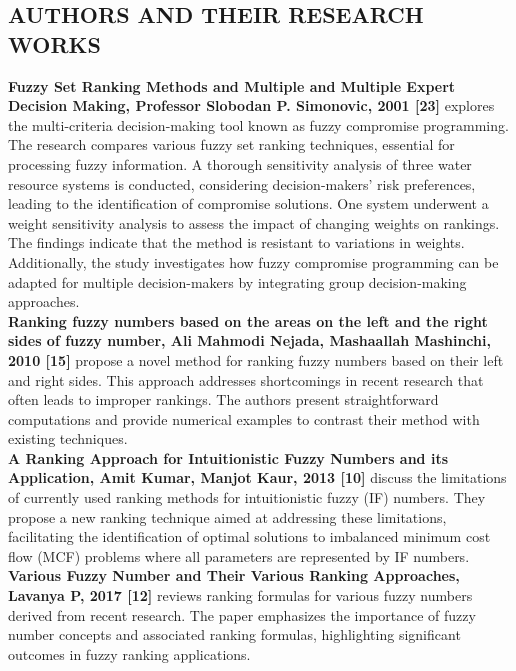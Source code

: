 \documentclass[12pt,a4paper]{article}
\begin{document}
\subsection{AUTHORS AND THEIR RESEARCH WORKS}

\hspace{1em}\textbf{Fuzzy Set Ranking Methods and Multiple and Multiple Expert Decision Making, Professor Slobodan P. Simonovic, 2001 [23]} explores the multi-criteria decision-making tool known as fuzzy compromise programming. The research compares various fuzzy set ranking techniques, essential for processing fuzzy information. A thorough sensitivity analysis of three water resource systems is conducted, considering decision-makers' risk preferences, leading to the identification of compromise solutions. One system underwent a weight sensitivity analysis to assess the impact of changing weights on rankings. The findings indicate that the method is resistant to variations in weights. Additionally, the study investigates how fuzzy compromise programming can be adapted for multiple decision-makers by integrating group decision-making approaches.\\

\textbf{ Ranking fuzzy numbers based on the areas on the left and the right sides of fuzzy number, Ali Mahmodi Nejada, Mashaallah Mashinchi, 2010 [15]} propose a novel method for ranking fuzzy numbers based on their left and right sides. This approach addresses shortcomings in recent research that often leads to improper rankings. The authors present straightforward computations and provide numerical examples to contrast their method with existing techniques.\\

\textbf{A Ranking Approach for Intuitionistic Fuzzy Numbers and its Application, Amit Kumar, Manjot Kaur, 2013 [10] }discuss the limitations of currently used ranking methods for intuitionistic fuzzy (IF) numbers. They propose a new ranking technique aimed at addressing these limitations, facilitating the identification of optimal solutions to imbalanced minimum cost flow (MCF) problems where all parameters are represented by IF numbers.\\

\textbf{Various Fuzzy Number and Their Various Ranking Approaches, Lavanya P, 2017 [12]} reviews ranking formulas for various fuzzy numbers derived from recent research. The paper emphasizes the importance of fuzzy number concepts and associated ranking formulas, highlighting significant outcomes in fuzzy ranking applications.\\
\end{document}
